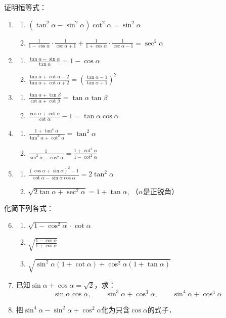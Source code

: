 \begin{ex}    
    证明恒等式：
\begin{enumerate}
    \item \begin{enumerate}
        \item $(\tan^2\alpha-\sin^2\alpha)\cot^2\alpha=\sin^2\alpha$
        \item $\frac{1}{1-\cos\alpha}\cdot\frac{1}{\csc\alpha+1}+\frac{1}{1+\cos\alpha}\cdot \frac{1}{\csc\alpha-1}=\sec^2\alpha$
    \end{enumerate}
\item \begin{enumerate}
    \item $\frac{\tan\alpha-\sin\alpha}{\tan \alpha}=1-\cos\alpha$
    \item $\frac{\tan\alpha+\cot\alpha-2}{\tan\alpha+\cot\alpha+2}=\left(\frac{\tan \alpha-1}{\tan\alpha+1}\right)^2$
\end{enumerate}
\item \begin{enumerate}
    \item $\frac{\tan\alpha+\tan\beta}{\cot\alpha+\cot\beta}=\tan\alpha\tan\beta$
    \item $\frac{\cos\alpha+\cot\alpha}{\cot\alpha}-1=\tan\alpha\cos\alpha$
\end{enumerate}

\item\begin{enumerate}
    \item  $\frac{1+\tan^4\alpha}{\tan^2\alpha+\cot^2\alpha}=\tan^2\alpha$
    \item $\frac{1}{\sin^2\alpha-\cos^2\alpha}=\frac{1+\cot^2\alpha}{1-\cot^2\alpha}$
\end{enumerate}
\item \begin{enumerate}
\item $\frac{(\cos\alpha+\sin\alpha)^2-1}{\cot\alpha-\sin\alpha\cos\alpha}=2\tan^2 \alpha$
    \item $\sqrt{2\tan\alpha+\sec^2\alpha}=1+\tan\alpha$,  （$\alpha$是正锐角）   
\end{enumerate}
\end{enumerate}
       
   化简下列各式：
\begin{enumerate}\setcounter{enumi}{5}
    \item \begin{enumerate}
        \item $\sqrt{1-\cos^2\alpha}\cdot \cot \alpha$
        \item $\sqrt{\frac{1-\cos\alpha}{1+\cos\alpha}}$
        \item $\sqrt{\sin^2\alpha(1+\cot\alpha)+\cos^2\alpha(1+\tan\alpha)}$
    \end{enumerate}
\item 已知$\sin\alpha+\cos\alpha=\sqrt{2}$，求：
\[\sin\alpha\cos\alpha,\qquad \sin^3\alpha+\cos^3\alpha,\qquad \sin^4\alpha+\cos^4\alpha\]
\item 把$\sin^4\alpha-\sin^2\alpha+\cos^2\alpha$化为只含$\cos\alpha$的式子．
\end{enumerate}
\end{ex}

